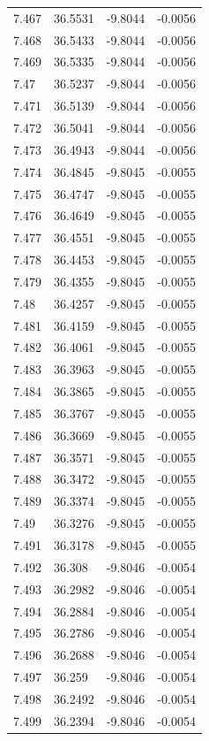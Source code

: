 \begin{tabular}{llll}
7.467 & 36.5531 & -9.8044 & -0.0056 \\
7.468 & 36.5433 & -9.8044 & -0.0056 \\
7.469 & 36.5335 & -9.8044 & -0.0056 \\
7.47 & 36.5237 & -9.8044 & -0.0056 \\
7.471 & 36.5139 & -9.8044 & -0.0056 \\
7.472 & 36.5041 & -9.8044 & -0.0056 \\
7.473 & 36.4943 & -9.8044 & -0.0056 \\
7.474 & 36.4845 & -9.8045 & -0.0055 \\
7.475 & 36.4747 & -9.8045 & -0.0055 \\
7.476 & 36.4649 & -9.8045 & -0.0055 \\
7.477 & 36.4551 & -9.8045 & -0.0055 \\
7.478 & 36.4453 & -9.8045 & -0.0055 \\
7.479 & 36.4355 & -9.8045 & -0.0055 \\
7.48 & 36.4257 & -9.8045 & -0.0055 \\
7.481 & 36.4159 & -9.8045 & -0.0055 \\
7.482 & 36.4061 & -9.8045 & -0.0055 \\
7.483 & 36.3963 & -9.8045 & -0.0055 \\
7.484 & 36.3865 & -9.8045 & -0.0055 \\
7.485 & 36.3767 & -9.8045 & -0.0055 \\
7.486 & 36.3669 & -9.8045 & -0.0055 \\
7.487 & 36.3571 & -9.8045 & -0.0055 \\
7.488 & 36.3472 & -9.8045 & -0.0055 \\
7.489 & 36.3374 & -9.8045 & -0.0055 \\
7.49 & 36.3276 & -9.8045 & -0.0055 \\
7.491 & 36.3178 & -9.8045 & -0.0055 \\
7.492 & 36.308 & -9.8046 & -0.0054 \\
7.493 & 36.2982 & -9.8046 & -0.0054 \\
7.494 & 36.2884 & -9.8046 & -0.0054 \\
7.495 & 36.2786 & -9.8046 & -0.0054 \\
7.496 & 36.2688 & -9.8046 & -0.0054 \\
7.497 & 36.259 & -9.8046 & -0.0054 \\
7.498 & 36.2492 & -9.8046 & -0.0054 \\
7.499 & 36.2394 & -9.8046 & -0.0054 \\

\end{tabular}
